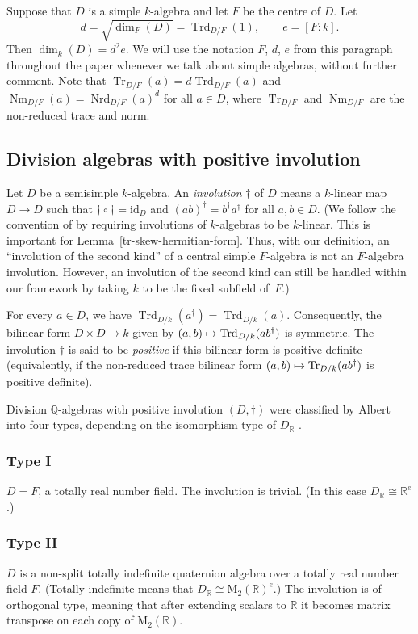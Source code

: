 \documentclass[JEP,XML,SOM,Unicode,NoFloatCountersInSection]{cedram}
\def\mto{\mathchoice{\longmapsto}{\mapsto}{\mapsto}{\mapsto}}
\newcommand{\bQ}{\mathbb{Q}}
\newcommand{\bR}{\mathbb{R}}
\newcommand{\rM}{\mathrm{M}}
\DeclareMathOperator{\Nm}{Nm}
\DeclareMathOperator{\Nrd}{Nrd}
\DeclareMathOperator{\Tr}{Tr}
\DeclareMathOperator{\Trd}{Trd}
\newcommand{\id}{\mathrm{id}}
\newcommand{\defterm}[1]{\emph{#1}}
\begin{document}
Suppose that $D$ is a simple $k$-algebra and let $F$ be the centre of $D$.
Let\vspace*{-3pt}
\[
d = \sqrt{\dim_F(D)} = \Trd_{D/F}(1), \qquad e = [F:k].
\]
Then $\dim_k(D) = d^2e$.
We will use the notation $F$, $d$, $e$ from this paragraph throughout the paper whenever we talk about simple algebras, without further comment.
Note that $\Tr_{D/F}(a) = d\Trd_{D/F}(a)$ and $\Nm_{D/F}(a) = \Nrd_{D/F}(a)^d$ for all $a \in D$, where $\Tr_{D/F}$ and $\Nm_{D/F}$ are the non-reduced trace and norm.

\subsection{Division algebras with positive involution} \label{subsec:albert}

Let $D$ be a semisimple $k$\nobreakdash-alge\-bra.
An \defterm{involution} $\dag$ of $D$ means a $k$-linear map $D \to D$ such that $\dag \circ \dag = \id_D$ and $(ab)^\dag = b^\dag a^\dag$ for all $a,b \in D$.
(We follow the convention of \cite[\S8]{Mil05} by requiring involutions of $k$-algebras to be $k$-linear. This is important for Lemma~\ref{tr-skew-hermitian-form}. Thus, with our definition, an ``involution of the second kind'' of a central simple $F$-algebra is not an $F$-algebra involution. However, an involution of the second kind can still be handled within our framework by taking $k$ to be the fixed subfield of~$F$.)

For every $a \in D$, we have $\Trd_{D/k}(a^\dag) = \Trd_{D/k}(a)$.
Consequently, the bilinear form $D \times D \to k$ given by $(a,b) \mto \Trd_{D/k}(ab^\dag)$ is symmetric. The involution $\dag$ is said to be \defterm{positive} if this bilinear form is positive definite (equivalently, if the non-reduced trace bilinear form $(a,b) \mto \Tr_{D/k}(ab^\dag)$ is positive definite).

Division $\bQ$-algebras with positive involution $(D,\dag)$ were classified by Albert into four types, depending on the isomorphism type of $D_\bR$ \cite[\S21, Th.\,2]{Mum74}.

\subsubsection*{Type I} $D = F$, a totally real number field. The involution is trivial. (In this case $D_\bR \cong \bR^e$.)
\subsubsection*{Type II} $D$ is a non-split totally indefinite quaternion algebra over a totally real number field $F$. (Totally indefinite means that $D_\bR \cong \rM_2(\bR)^e$.)
The involution is of orthogonal type, meaning that after extending scalars to $\bR$ it becomes matrix transpose on each copy of $\rM_2(\bR)$.
\end{document}
